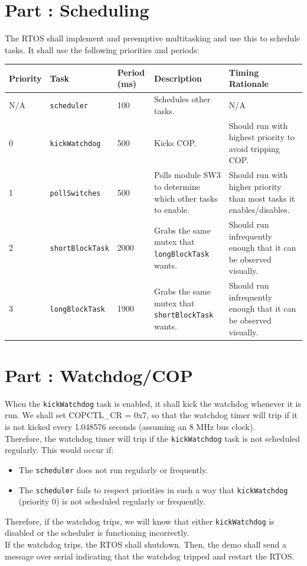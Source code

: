 \documentclass{article}
\newcounter{partNum}
\newcommand{\partNum}{%
        \stepcounter{partNum}%
        \thepartNum}
\newcommand{\sectPart}[1]{\section*{Part \partNum: #1}}
\begin{document}

\sectPart{Scheduling}

The RTOS shall implement and preemptive multitasking and use this to schedule tasks. It shall use the following priorities and periods:

\vspace{1em}

\begin{center}
    \begin{tabular}{|l|l|l|p{10em}|p{15em}|}
        \hline
        \textbf{Priority} & \textbf{Task} & \textbf{Period (ms)} & \textbf{Description} & \textbf{Timing Rationale} \\ \hline
        N/A & \texttt{scheduler} & 100 & Schedules other tasks. & N/A \\ \hline
        0 & \texttt{kickWatchdog} & 500 & Kicks COP. & Should run with highest priority to avoid tripping COP. \\ \hline
        1 & \texttt{pollSwitches} & 500 & Polls module SW3 to determine which other tasks to enable. & Should run with higher priority than most tasks it enables/disables. \\ \hline
        2 & \texttt{shortBlockTask} & 2000 & Grabs the same mutex that \texttt{longBlockTask} wants. & Should run infrequently enough that it can be observed visually. \\ \hline
        3 & \texttt{longBlockTask} & 1900 & Grabs the same mutex that \texttt{shortBlockTask} wants. & Should run infrequently enough that it can be observed visually. \\ \hline
    \end{tabular}
\end{center}


\newpage

\sectPart{Watchdog/COP}

When the \texttt{kickWatchdog} task is enabled, it shall kick the watchdog whenever it is run. We shall set COPCTL\_CR = 0x7, so that the watchdog timer will trip if it is not kicked every 1.048576 seconds (assuming an 8 MHz bus clock). \\
Therefore, the watchdog timer will trip if the \texttt{kickWatchdog} task is not scheduled regularly. This would occur if:
    \begin{itemize}
        \item The \texttt{scheduler} does not run regularly or frequently.
        \item The \texttt{scheduler} fails to respect priorities in such a way that \texttt{kickWatchdog} (priority 0) is not scheduled regularly or frequently.
    \end{itemize}
Therefore, if the watchdog trips, we will know that either \texttt{kickWatchdog} is disabled or the scheduler is functioning incorrectly. \\
If the watchdog trips, the RTOS shall shutdown. Then, the demo shall send a message over serial indicating that the watchdog tripped and restart the RTOS.
\end{document}
